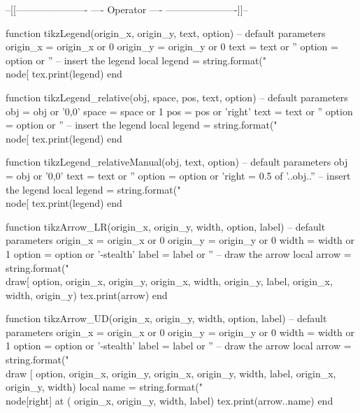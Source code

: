 \usepackage{tikz}
\usetikzlibrary{math}
\usetikzlibrary{calc}
\usetikzlibrary{fit}
\usetikzlibrary{positioning} %
\usetikzlibrary{decorations.pathreplacing}
\usetikzlibrary{decorations.shapes}
\usetikzlibrary{shapes.geometric}
\usetikzlibrary{arrows}
\usepackage{luacode}

\begin{luacode*}

	--[[----------------------
	----     Operator     ----
	----------------------]]--
  
	function tikzLegend(origin_x, origin_y, text, option)
	  -- default parameters
	  origin_x = origin_x or 0
	  origin_y = origin_y or 0
	  text = text or ''
	  option = option or ''
	  -- insert the legend
	  local legend = string.format("\\node[%
	  tex.print(legend)
	end
  
	function tikzLegend_relative(obj, space, pos, text, option)
	  -- default parameters
	  obj = obj or '0,0'
	  space = space or 1
	  pos = pos or 'right'
	  text = text or ''
	  option = option or ''
	  -- insert the legend
	  local legend = string.format("\\node[%
	  tex.print(legend)
	end
  
	function tikzLegend_relativeManual(obj, text, option)
	  -- default parameters
	  obj = obj or '0,0'
	  text = text or ''
	  option = option or 'right = 0.5 of '..obj..''
	  -- insert the legend
	  local legend = string.format("\\node[%
	  tex.print(legend)
	end
  
  
	function tikzArrow_LR(origin_x, origin_y, width, option, label)
	-- default parameters
	  origin_x = origin_x or 0
	  origin_y = origin_y or 0
	  width = width or 1
	  option = option or '-stealth'
	  label = label or ''
	  -- draw the arrow
	  local arrow = string.format("\\draw[%
	  option, origin_x, origin_y, origin_x, width, origin_y, label, origin_x, width, origin_y)
	  tex.print(arrow)
	end
  
	function tikzArrow_UD(origin_x, origin_y, width, option, label)
	-- default parameters
	origin_x = origin_x or 0
	origin_y = origin_y or 0
	width = width or 1
	option = option or '-stealth'
	label = label or ''
	-- draw the arrow
	local arrow = string.format("\\draw [%
	option, origin_x, origin_y, origin_x, origin_y, width, label, origin_x, origin_y, width)
	local name = string.format("\\node[right] at (%
	origin_x, origin_y, width, label)
	tex.print(arrow..name)
	end
  

\end{luacode*}
